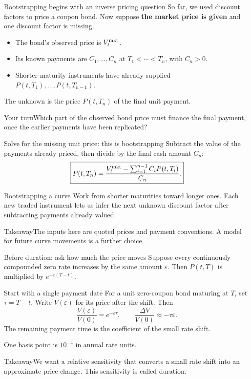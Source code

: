 \documentclass[handout,10pt,t,aspectratio=169]{beamer}
\newenvironment{pausebox}{\begin{block}{Your turn}}{\end{block}}
\newenvironment{keybox}{\begin{exampleblock}{Takeaway}}{\end{exampleblock}}
\begin{document}
\begin{frame}{Bootstrapping begins with an inverse pricing question}
So far, we used discount factors to price a coupon bond.
Now suppose \textbf{the market price is given} and one discount factor is missing.
\begin{itemize}
\item The bond's observed price is \(V_t^{\rm mkt}\).
\item Its known payments are \(C_1,\ldots,C_n\) at \(T_1<\cdots<T_n\),
with \(C_n>0\).
\item Shorter-maturity instruments have already supplied
\(P(t,T_1),\ldots,P(t,T_{n-1})\).
\end{itemize}
The unknown is the price \(P(t,T_n)\) of the final unit payment.
\begin{pausebox}Which part of the observed bond price must finance the
final payment, once the earlier payments have been replicated?\end{pausebox}
\end{frame}

\begin{frame}{Solve for the missing unit price: this is bootstrapping}
\small
Subtract the value of the payments already priced, then divide by
the final cash amount \(C_n\):
\[
 \boxed{P(t,T_n)=
 \frac{V_t^{\rm mkt}-\sum_{i=1}^{n-1}C_iP(t,T_i)}{C_n}.}
\]
\begin{block}{Bootstrapping a curve}
Work from shorter maturities toward longer ones. Each new traded instrument
lets us infer the next unknown discount factor after subtracting payments already valued.
\end{block}
\begin{keybox}The inputs here are quoted prices and payment conventions.
A model for future curve movements is a further choice.\end{keybox}
\end{frame}

\begin{frame}{Before duration: ask how much the price moves}
Suppose every continuously compounded zero rate increases by the same amount \(\varepsilon\).
Then \(P(t,T)\) is multiplied by \(e^{-\varepsilon(T-t)}\).
\begin{exampleblock}{Start with a single payment date}
For a unit zero-coupon bond maturing at \(T\), set \(\tau=T-t\).
Write \(V(\varepsilon)\) for its price after the shift. Then
\[
 \frac{V(\varepsilon)}{V(0)}=e^{-\varepsilon\tau},
 \qquad \frac{\Delta V}{V(0)}\approx-\tau\varepsilon.
\]
The remaining payment time is the coefficient of the small rate shift.
\end{exampleblock}
One basis point is \(10^{-4}\) in annual rate units.
\begin{keybox}We want a relative sensitivity that converts a small rate shift
into an approximate price change. This sensitivity is called duration.\end{keybox}
\end{frame}
\end{document}
